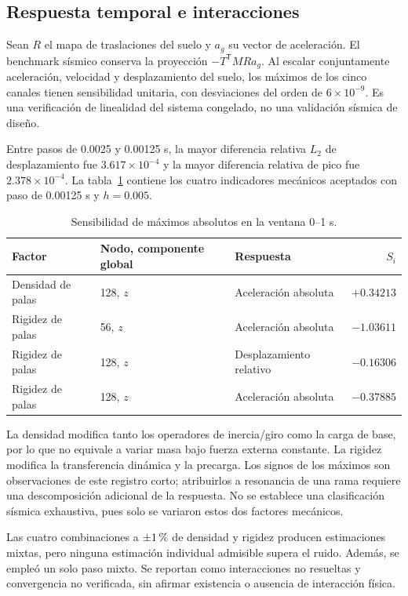 \subsection{Respuesta temporal e interacciones}
Sean $R$ el mapa de traslaciones del suelo y $a_g$ su vector de aceleración. El benchmark sísmico conserva la proyección $-T^{\mathsf T}MRa_g$. Al escalar conjuntamente aceleración, velocidad y desplazamiento del suelo, los máximos de los cinco canales tienen sensibilidad unitaria, con desviaciones del orden de $6\times10^{-9}$. Es una verificación de linealidad del sistema congelado, no una validación sísmica de diseño.

Entre pasos de 0.0025 y 0.00125 s, la mayor diferencia relativa $L_2$ de desplazamiento fue $3.617\times10^{-4}$ y la mayor diferencia relativa de pico fue $2.378\times10^{-4}$. La tabla~\ref{tab:time} contiene los cuatro indicadores mecánicos aceptados con paso de 0.00125 s y $h=0.005$.

\begin{table}[htbp]
\centering\small
\caption{Sensibilidad de máximos absolutos en la ventana 0--1 s.}\label{tab:time}
\begin{tabular}{lllr}
\toprule
Factor & Nodo, componente global & Respuesta & $S_i$\\
\midrule
Densidad de palas & 128, $z$ & Aceleración absoluta & $+0.34213$\\
Rigidez de palas & 56, $z$ & Aceleración absoluta & $-1.03611$\\
Rigidez de palas & 128, $z$ & Desplazamiento relativo & $-0.16306$\\
Rigidez de palas & 128, $z$ & Aceleración absoluta & $-0.37885$\\
\bottomrule
\end{tabular}
\end{table}

La densidad modifica tanto los operadores de inercia/giro como la carga de base, por lo que no equivale a variar masa bajo fuerza externa constante. La rigidez modifica la transferencia dinámica y la precarga. Los signos de los máximos son observaciones de este registro corto; atribuirlos a resonancia de una rama requiere una descomposición adicional de la respuesta. No se establece una clasificación sísmica exhaustiva, pues solo se variaron estos dos factores mecánicos.

Las cuatro combinaciones a $\pm1\,\text{\char37}$ de densidad y rigidez producen estimaciones mixtas, pero ninguna estimación individual admisible supera el ruido. Además, se empleó un solo paso mixto. Se reportan como interacciones no resueltas y convergencia no verificada, sin afirmar existencia o ausencia de interacción física.

